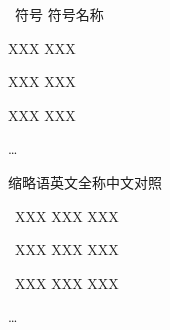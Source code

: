 \XDUpremainmatter

\begin{symbollist}
\item ~符号 \hspace{12em} 符号名称
\item XXX \hspace{12.5em} XXX
\item XXX \hspace{12.5em} XXX
\item XXX \hspace{12.5em} XXX
\item \ldots
\end{symbollist}

\begin{abbreviationlist}
\item 缩略语\hspace{6em}英文全称\hspace{6em}中文对照
\item ~XXX \hspace{7em} XXX \hspace{7.5em} XXX
\item ~XXX \hspace{7em} XXX \hspace{7.5em} XXX
\item ~XXX \hspace{7em} XXX \hspace{7.5em} XXX
\item \ldots
\end{abbreviationlist}
